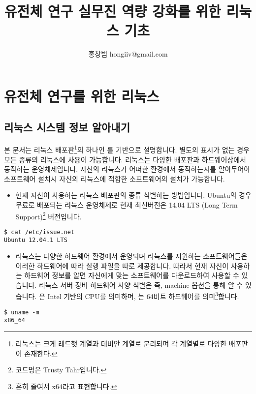 \documentclass{article}
\title{유전체 연구 실무진 역량 강화를 위한 리눅스 기초}
\author{홍창범 hongiiv@gmail.com}
\begin{document}


\maketitle

\tableofcontents
\section{유전체 연구를 위한 리눅스}
\subsection{리눅스 시스템 정보 알아내기}

본 문서는 리눅스 배포판\footnote{리눅스는 크게 레드햇 계열과 데비안 계열로 분리되며 각 계열별로 다양한 배포판이 존재한다.}의 하나인 를 기반으로 설명합니다. 별도의 표시가 없는 경우 모든 종류의 리눅스에 사용이 가능합니다. 리눅스는 다양한 배포판과 하드웨어상에서 동작하는 운영체제입니다. 자신의 리눅스가 어떠한 환경에서 동작하는지를 알아두어야 소프트웨어 설치시 자신의 리눅스에 적합한 소프트웨어의 설치가 가능합니다.
\begin{itemize}
\item
  \begin{itemize}
  현재 자신이 사용하는 리눅스 배포판의 종류 식별하는 방법입니다. Ubuntu의 경우 무료로 배포되는 리눅스 운영체제로 현재 최신버전은 14.04 LTS (Long Term Support)\footnote{코드명은 Trusty Tahr입니다.} 버전입니다.
  \end{itemize}
\end{itemize}
\begin{lstlisting}[frame=single,style=Bash,xleftmargin=1.4cm,xrightmargin=1.4cm]
$ cat /etc/issue.net
Ubuntu 12.04.1 LTS
\end{lstlisting}

\begin{itemize}
\item
  \begin{itemize}
  리눅스는 다양한 하드웨어 환경에서 운영되며 리눅스를 지원하는 소프트웨어들은 이러한 하드웨어에 따라 실행 파일을 따로 제공합니다. 따라서 현재 자신이 사용하는 하드웨어 정보를 알면 자신에게 맞는 소프트웨어를 다운로드하여 사용할 수 있습니다. 리눅스 서버 장비 하드웨어 사양 식별은  즉, machine 옵션을 통해 알 수 있습니다. 은 Intel 기반의 CPU를 의미하며, 는 64비트 하드웨어를 의미\footnote{흔히 줄여서 x64라고 표현합니다.}합니다.
  \end{itemize}
\end{itemize}
\begin{lstlisting}[frame=single,style=Bash,xleftmargin=1.4cm,xrightmargin=1.4cm]
$ uname -m
x86_64
\end{lstlisting}
\end{document}
